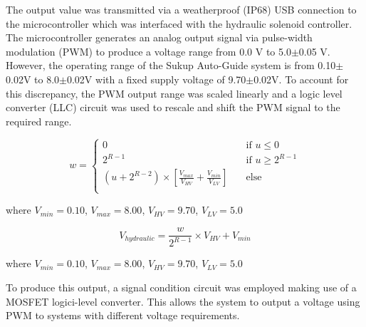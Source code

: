 \documentclass[authoryear]{elsarticle}
\begin{document}
The output value was transmitted via a weatherproof (IP68) USB
connection to the microcontroller which was interfaced with the
hydraulic solenoid controller. The microcontroller generates an analog
output signal via pulse-width modulation (PWM) to produce a voltage
range from 0.0 V to 5.0$\pm$0.05 V. However, the operating range of the
Sukup Auto-Guide system is from 0.10$\pm$0.02V to 8.0$\pm$0.02V with a fixed
supply voltage of 9.70$\pm$0.02V. To account for this discrepancy, the PWM
output range was scaled linearly and a logic level converter (LLC)
circuit was used to rescale and shift the PWM signal to the required
range.

\begin{equation}
  w = 
  \begin{cases}
    0 & \quad \text{if } u \leq 0 \\
    2^{R-1} & \quad \text{if } u \geq 2^{R-1}\\
    (u +2^{R-2})\times\left[\frac{V_{max}}{V_{HV}}+\frac{V_{min}}{V_{LV}}\right] & \quad \text{else} \\
  \end{cases}
  \label{eq:v_out}
\end{equation}
\begin{flushleft}
where $V_{min}=0.10$, $V_{max}=8.00$, $V_{HV}=9.70$, $V_{LV}=5.0$
\end{flushleft}

\begin{equation}
  V_{hydraulic} = \frac{w}{2^{R-1}} \times V_{HV} + V_{min}
  \label{eq:v_out}
\end{equation}
\begin{flushleft}
where $V_{min}=0.10$, $V_{max}=8.00$, $V_{HV}=9.70$, $V_{LV}=5.0$
\end{flushleft}

To produce this output, a signal condition circuit was employed making
use of a MOSFET logici-level converter. This allows the system to
output a voltage using PWM to systems with different voltage
requirements.
\end{document}
